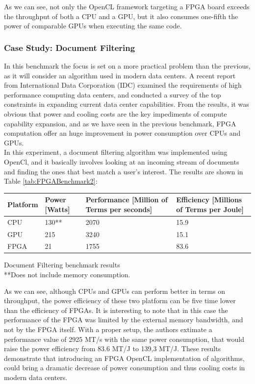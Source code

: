 As we can see, not only the OpenCL framework targeting a FPGA board exceeds the throughput of both a CPU and a GPU, but it also consumes one-fifth the power of comparable GPUs when executing the same code.

\subsubsection{Case Study: Document Filtering}

In this benchmark the focus is set on a more practical problem than the previous, as it will consider an algorithm used in modern data centers.
A recent report \cite{walsh:power} from International Data Corporation (IDC) examined the requirements of high performance computing data centers, and conducted a survey of the top constraints in expanding current data center capabilities. From the results, it was obvious that power and cooling costs are the key impediments of compute capability expansion, and as we have seen in the previous benchmark, FPGA computation offer an huge improvement in power consumption over CPUs and GPUs.\\

In this experiment, a document filtering algorithm was implemented using OpenCl, and it basically involves looking at an incoming stream of documents and finding the ones that best match a user’s interest. The results are shown in Table \ref{tab:FPGABenchmark2}:

\begin{tablehere}
{\footnotesize
\begin{tabular}{|p{}|p{}|p{}|p{}|}\hline
\textbf{Platform} & \textbf{Power} [Watts] & \textbf{Performance} [Million of Terms per seconds] & \textbf{Efficiency} [Millions of Terms per Joule]\\ \hline
CPU & 130** & 2070 & 15.9 \\ \hline
GPU & 215 & 3240 & 15.1 \\ \hline
FPGA & 21 & 1755 & 83.6 \\ \hline
\end{tabular}}
  \caption{Document Filtering benchmark results\\ **Does not include memory consumption.}
	\label{tab:FPGABenchmark2}
\end{tablehere}

As we can see, although CPUs and GPUs can perform better in terms on throughput, the power efficiency of these two platform can be five time lower than the efficiency of FPGAs. It is interesting to note that in this case the performance of the FPGA was limited by the external memory bandwidth, and not by the FPGA itself. With a proper setup, the authors extimate a performance value of 2925 MT/s with the same power consumption, that would raise the power efficiency from 83.6 MT/J to 139,3 MT/J.
These results demonstrate that introducing an FPGA OpenCL implementation of algorithms, could bring a dramatic decrease of power consumption and thus cooling costs in modern data centers.


